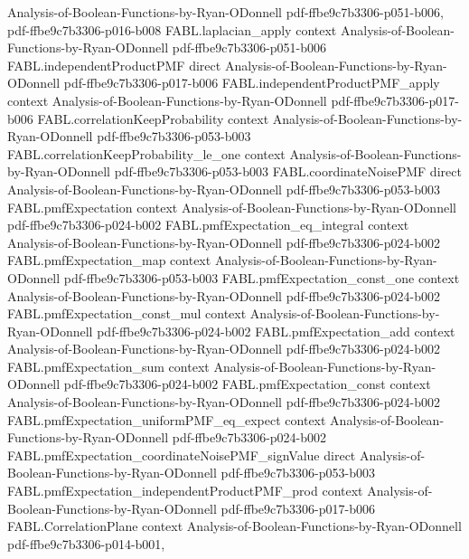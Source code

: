 \begin{theorem}
  {Analysis-of-Boolean-Functions-by-Ryan-ODonnell}
  {pdf-ffbe9c7b3306-p051-b006,
    pdf-ffbe9c7b3306-p016-b008}
\proofstep
  {FABL.laplacian_apply}
  {context}
  {Analysis-of-Boolean-Functions-by-Ryan-ODonnell}
  {pdf-ffbe9c7b3306-p051-b006}
\proofstep
  {FABL.independentProductPMF}
  {direct}
  {Analysis-of-Boolean-Functions-by-Ryan-ODonnell}
  {pdf-ffbe9c7b3306-p017-b006}
\proofstep
  {FABL.independentProductPMF_apply}
  {context}
  {Analysis-of-Boolean-Functions-by-Ryan-ODonnell}
  {pdf-ffbe9c7b3306-p017-b006}
\proofstep
  {FABL.correlationKeepProbability}
  {context}
  {Analysis-of-Boolean-Functions-by-Ryan-ODonnell}
  {pdf-ffbe9c7b3306-p053-b003}
\proofstep
  {FABL.correlationKeepProbability_le_one}
  {context}
  {Analysis-of-Boolean-Functions-by-Ryan-ODonnell}
  {pdf-ffbe9c7b3306-p053-b003}
\proofstep
  {FABL.coordinateNoisePMF}
  {direct}
  {Analysis-of-Boolean-Functions-by-Ryan-ODonnell}
  {pdf-ffbe9c7b3306-p053-b003}
\proofstep
  {FABL.pmfExpectation}
  {context}
  {Analysis-of-Boolean-Functions-by-Ryan-ODonnell}
  {pdf-ffbe9c7b3306-p024-b002}
\proofstep
  {FABL.pmfExpectation_eq_integral}
  {context}
  {Analysis-of-Boolean-Functions-by-Ryan-ODonnell}
  {pdf-ffbe9c7b3306-p024-b002}
\proofstep
  {FABL.pmfExpectation_map}
  {context}
  {Analysis-of-Boolean-Functions-by-Ryan-ODonnell}
  {pdf-ffbe9c7b3306-p053-b003}
\proofstep
  {FABL.pmfExpectation_const_one}
  {context}
  {Analysis-of-Boolean-Functions-by-Ryan-ODonnell}
  {pdf-ffbe9c7b3306-p024-b002}
\proofstep
  {FABL.pmfExpectation_const_mul}
  {context}
  {Analysis-of-Boolean-Functions-by-Ryan-ODonnell}
  {pdf-ffbe9c7b3306-p024-b002}
\proofstep
  {FABL.pmfExpectation_add}
  {context}
  {Analysis-of-Boolean-Functions-by-Ryan-ODonnell}
  {pdf-ffbe9c7b3306-p024-b002}
\proofstep
  {FABL.pmfExpectation_sum}
  {context}
  {Analysis-of-Boolean-Functions-by-Ryan-ODonnell}
  {pdf-ffbe9c7b3306-p024-b002}
\proofstep
  {FABL.pmfExpectation_const}
  {context}
  {Analysis-of-Boolean-Functions-by-Ryan-ODonnell}
  {pdf-ffbe9c7b3306-p024-b002}
\proofstep
  {FABL.pmfExpectation_uniformPMF_eq_expect}
  {context}
  {Analysis-of-Boolean-Functions-by-Ryan-ODonnell}
  {pdf-ffbe9c7b3306-p024-b002}
\proofstep
  {FABL.pmfExpectation_coordinateNoisePMF_signValue}
  {direct}
  {Analysis-of-Boolean-Functions-by-Ryan-ODonnell}
  {pdf-ffbe9c7b3306-p053-b003}
\proofstep
  {FABL.pmfExpectation_independentProductPMF_prod}
  {context}
  {Analysis-of-Boolean-Functions-by-Ryan-ODonnell}
  {pdf-ffbe9c7b3306-p017-b006}
\proofstep
  {FABL.CorrelationPlane}
  {context}
  {Analysis-of-Boolean-Functions-by-Ryan-ODonnell}
  {pdf-ffbe9c7b3306-p014-b001,
}
\end{theorem}
